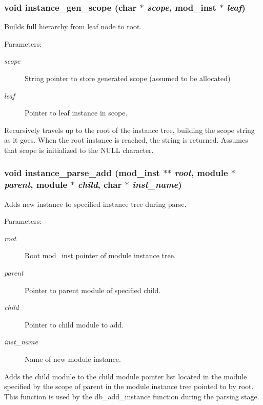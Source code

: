 \subsubsection{\setlength{\rightskip}{0pt plus 5cm}void instance\_\-gen\_\-scope (char $\ast$ {\em scope}, {\bf mod\_\-inst} $\ast$ {\em leaf})}\label{instance_8h_a0}


Builds full hierarchy from leaf node to root. 

\begin{Desc}
\item[Parameters:]
\begin{description}
\item[{\em scope}]String pointer to store generated scope (assumed to be allocated) \item[{\em leaf}]Pointer to leaf instance in scope.\end{description}
\end{Desc}
Recursively travels up to the root of the instance tree, building the scope string as it goes. When the root instance is reached, the string is returned. Assumes that scope is initialized to the NULL character. 
\subsubsection{\setlength{\rightskip}{0pt plus 5cm}void instance\_\-parse\_\-add ({\bf mod\_\-inst} $\ast$$\ast$ {\em root}, {\bf module} $\ast$ {\em parent}, {\bf module} $\ast$ {\em child}, char $\ast$ {\em inst\_\-name})}\label{instance_8h_a3}


Adds new instance to specified instance tree during parse. 

\begin{Desc}
\item[Parameters:]
\begin{description}
\item[{\em root}]Root mod\_\-inst pointer of module instance tree. \item[{\em parent}]Pointer to parent module of specified child. \item[{\em child}]Pointer to child module to add. \item[{\em inst\_\-name}]Name of new module instance.\end{description}
\end{Desc}
Adds the child module to the child module pointer list located in the module specified by the scope of parent in the module instance tree pointed to by root. This function is used by the db\_\-add\_\-instance function during the parsing stage. 
